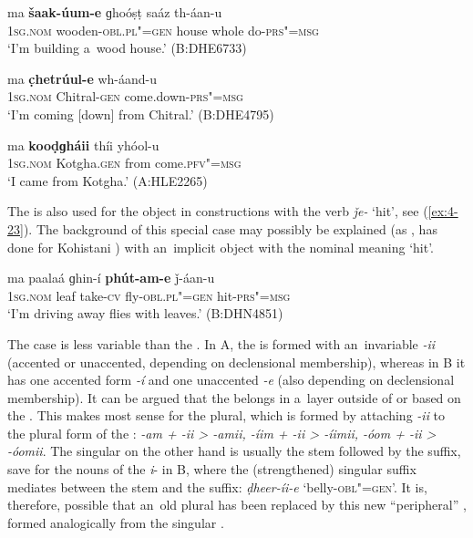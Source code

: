 \begin{exe}
\ex
\label{ex:4-20}
\gll ma \textbf{šaak-úum-e} ɡhoóṣṭ saáz th-áan-u \\
	\textsc{1sg.nom} wooden-\textsc{obl.pl"=gen} house whole do-\textsc{prs"=msg} \\
\glt `I'm building a~wood house.' (B:DHE6733)
\end{exe}

\begin{exe}
\ex
\label{ex:4-21}
\gll ma \textbf{c̣hetrúul-e} wh-áand-u \\
	\textsc{1sg.nom} Chitral-\textsc{gen} come.down-\textsc{prs"=msg} \\
\glt `I'm coming [down] from Chitral.' (B:DHE4795)
\end{exe}

\begin{exe}
\ex
\label{ex:4-22}
\gll ma \textbf{kooḍɡháii} thíi yhóol-u \\
	\textsc{1sg.nom} Kotgha.\textsc{gen} from come.\textsc{pfv"=msg} \\
\glt `I came from Kotgha.' (A:HLE2265)
\end{exe}

The  is also used for the object in constructions with the verb \textit{ǰe-} `hit', see (\ref{ex:4-23}). The background of this special case may possibly be explained (as \citealt[43]{baart1999a}, has done for Kohistani \iliGawri) with an~implicit object with the nominal meaning `hit'.

\begin{exe}
\ex
\label{ex:4-23}
\gll ma paalaá ɡhin-í \textbf{phút-am-e} ǰ-áan-u \\
	\textsc{1sg.nom} leaf take-\textsc{cv} fly-\textsc{obl.pl"=gen} hit-\textsc{prs"=msg} \\
\glt `I'm driving away flies with leaves.' (B:DHN4851)
\end{exe}

The  case  is less variable than the . In A, the  is formed with an~invariable \textit{-ii} (accented or unaccented, depending on declensional membership), whereas in B it has one accented form \textit{-í} and one unaccented \textit{-e} (also depending on declensional membership). It can be argued that the  belongs in a~layer outside of or based on the . This makes most sense for the  plural, which is formed by attaching \textit{-ii} to the  plural form of the : \textit{-am + -ii {\textgreater} -amii, -íim + -ii {\textgreater} -íimii, -óom + -ii {\textgreater} -óomii}. The  singular on the other hand is usually the  stem followed by the  suffix, save for the nouns of the \textit{i}- in B, where the (strengthened)  singular suffix mediates between the stem and the  suffix: \textit{ḍheer-íi-e} `belly-\textsc{obl"=gen}'. It is, therefore, possible that an~old  plural has been replaced by this new ``peripheral'' , formed analogically from the singular .

